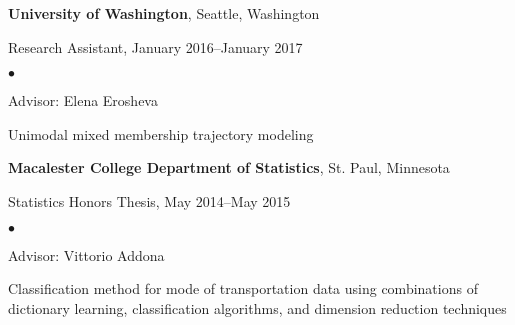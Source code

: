 \documentclass[margin,centered]{res}
\newenvironment{list1}{
  \begin{list}{\ding{113}}{%
      \setlength{\itemsep}{0in}
      \setlength{\parsep}{0in} \setlength{\parskip}{0in}
      \setlength{\topsep}{0in} \setlength{\partopsep}{0in}
      \setlength{\leftmargin}{0.17in}}}{\end{list}}
\newenvironment{list2}{
  \begin{list}{$\bullet$}{%
      \setlength{\itemsep}{0in}
      \setlength{\parsep}{0in} \setlength{\parskip}{0in}
      \setlength{\topsep}{0in} \setlength{\partopsep}{0in}
      \setlength{\leftmargin}{0.2in}}}{\end{list}}
\begin{document}
\begin{resume}
{\bf University of Washington},  Seattle, Washington
\begin{list1}
\item[] 
Research Assistant, January 2016--January 2017
\begin{list2}
\vspace*{.05in}
\item Advisor: Elena Erosheva
\item Unimodal mixed membership trajectory modeling
\end{list2} 
\end{list1}




{\bf Macalester College Department of Statistics}, St. Paul, Minnesota
\begin{list1}
\item[] 
Statistics Honors Thesis, May 2014--May 2015
\begin{list2}
\vspace*{.05in}
\item
Advisor: Vittorio Addona
\item Classification method for mode of transportation data using combinations of dictionary learning, classification algorithms, and dimension reduction techniques
\end{list2} 
\end{list1}


\begin{comment}
{\bf Institute for Mathematics and Its Applications}, Minneapolis, Minnesota
\begin{list1}
\item[] 
Research Assistant, May 2014--July 2014
\begin{list2}
\vspace*{.05in}
\item
 Developed a model to automatically predict mode of transportation using smartphone sensor data
 \item Manipulated, cleaned, and visualized large time-series data sets in R
\item Contributed random forest methods of final model to Android smartphone application
 \item Presented research findings biweekly, created research poster and paper
\end{list2} 
\end{list1}



\end{comment}
\end{resume}
\end{document}
